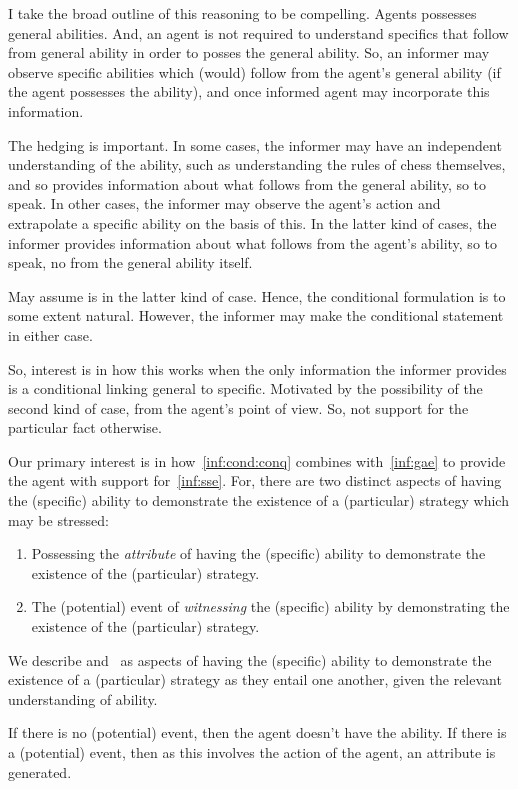 \documentclass[10pt]{article}
\begin{document}
\begin{note}
  I take the broad outline of this reasoning to be compelling. Agents possesses general abilities. And, an agent is not required to understand specifics that follow from general ability in order to posses the general ability. So, an informer may observe specific abilities which (would) follow from the agent's general ability (if the agent possesses the ability), and once informed agent may incorporate this information.

  The hedging is important. In some cases, the informer may have an independent understanding of the ability, such as understanding the rules of chess themselves, and so provides information about what follows from the general ability, so to speak. In other cases, the informer may observe the agent's action and extrapolate a specific ability on the basis of this. In the latter kind of cases, the informer provides information about what follows from the agent's ability, so to speak, no from the general ability itself.

  May assume is in the latter kind of case. Hence, the conditional formulation is to some extent natural. However, the informer may make the conditional statement in either case.

  So, interest is in how this works when the only information the informer provides is a conditional linking general to specific. Motivated by the possibility of the second kind of case, from the agent's point of view. So, not support for the particular fact otherwise.
\end{note}

\begin{note}
  Our primary interest is in how~\ref{inf:cond:conq} combines with~\ref{inf:gae} to provide the agent with support for~\ref{inf:sse}.
  For, there are two distinct aspects of having the (specific) ability to demonstrate the existence of a (particular) strategy which may be stressed:
  \begin{enumerate}
  \item\label{Ab:asp:A} Possessing the \emph{attribute} of having the (specific) ability to demonstrate the existence of the (particular) strategy.
  \item\label{Ab:asp:W} The (potential) event of \emph{witnessing} the (specific) ability by demonstrating the existence of the (particular) strategy.
  \end{enumerate}
  We describe \label{Ab:asp:A} and~\label{Ab:asp:W} as aspects of having the (specific) ability to demonstrate the existence of a (particular) strategy as they entail one another, given the relevant understanding of ability.

  If there is no (potential) event, then the agent doesn't have the ability.
  If there is a (potential) event, then as this involves the action of the agent, an attribute is generated.
\end{note}
\end{document}
